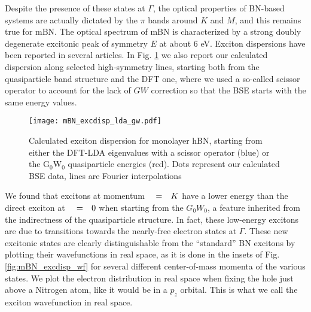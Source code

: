 Despite the presence of these states at $\Gamma$, the optical properties of BN-based systems are actually dictated by the $\pi$ bands around $K$ and $M$, and this remains true for mBN.
The optical spectrum of mBN is characterized by a strong doubly degenerate excitonic peak of symmetry $E$ at about $6$ eV. Exciton dispersions have been reported in several articles.\cite{cudazzo2016exciton,koskelo2017excitons,sponza2018direct} In Fig. \ref{fig:mBN_excdisp_lda_gw} we also report our calculated dispersion along selected high-symmetry lines, starting both from the quasiparticle band structure and the DFT one, where we used a so-called scissor operator to account for the lack of $GW$ correction so that the BSE starts with the same energy values.
\begin{figure}[h!b]
	\vspace{0.2cm}
	\setcapindent{2em}
	\centering
	\texttt{[image: mBN\_excdisp\_lda\_gw.pdf]}
	\caption{Calculated exciton dispersion for monolayer hBN, starting from either the DFT-LDA eigenvalues with a scissor operator (blue) or the G$_0$W$_0$ quasiparticle energies (red). Dots represent our calculated BSE data, lines are Fourier interpolations}
	\label{fig:mBN_excdisp_lda_gw}
\end{figure}
We found that excitons at momentum $\qq=K$ have a lower energy than the direct exciton at $\qq=0$ when starting from the $G_0W_0$, a feature inherited from the indirectness of the quasiparticle structure. In fact, these low-energy excitons are due to transitions towards the nearly-free electron states at $\Gamma$.
These new excitonic states are clearly distinguishable from the ``standard'' BN excitons by plotting their wavefunctions in real space, as it is done in the insets of Fig. \ref{fig:mBN_excdisp_wf} for several different center-of-mass momenta of the various states. We plot the electron distribution in real space when fixing the hole just above a Nitrogen atom, like it would be in a $p_z$ orbital. This is what we call the exciton wavefunction in real space.

